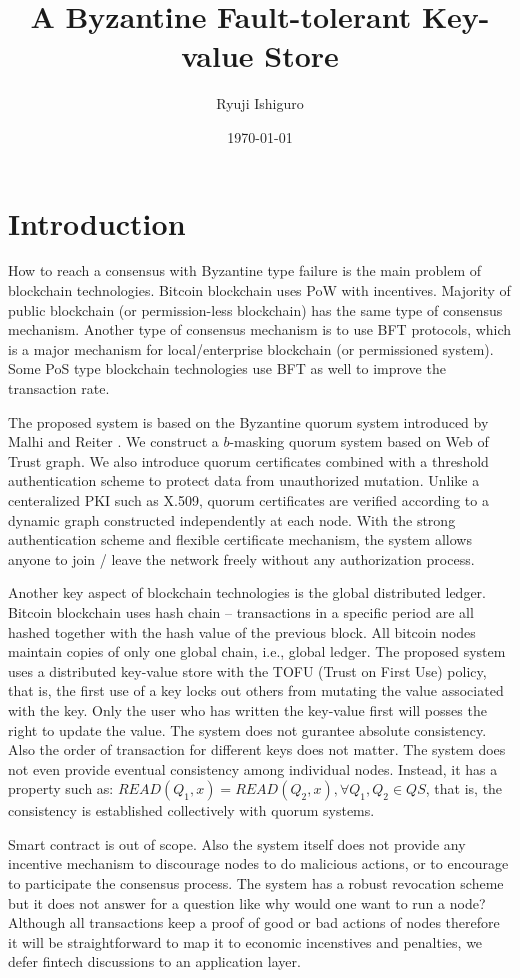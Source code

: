 \documentclass[twoside,twocolumn,10pt,fleqn]{article}
\title{A Byzantine Fault-tolerant Key-value Store}
\author{Ryuji Ishiguro}
\date{\today}
\begin{document}
\maketitle

\section{Introduction}
How to reach a consensus with Byzantine type failure is the main
problem of blockchain technologies. Bitcoin blockchain uses PoW with
incentives. Majority of public blockchain (or permission-less
blockchain) has the same type of consensus mechanism. Another type of
consensus mechanism is to use BFT protocols, which is a major
mechanism for local/enterprise blockchain (or permissioned
system). Some PoS type blockchain technologies use BFT as well to
improve the transaction rate.

The proposed system is based on the Byzantine quorum system introduced
by Malhi and Reiter \cite{Delhi:1}. We construct a $b$-masking quorum
system based on Web of Trust graph. We also introduce quorum certificates
combined with a threshold authentication scheme to protect data from
unauthorized mutation. Unlike a centeralized PKI such as X.509, quorum
certificates are verified according to a dynamic graph constructed
independently at each node. With the strong authentication scheme and
flexible certificate mechanism, the system allows anyone to join /
leave the network freely without any authorization process.

Another key aspect of blockchain technologies is the global
distributed ledger. Bitcoin blockchain uses hash chain -- transactions
in a specific period are all hashed together with the hash value of
the previous block. All bitcoin nodes maintain copies of only one
global chain, i.e., global ledger.
The proposed system uses a distributed key-value store with the TOFU
(Trust on First Use) policy, that is, the first use of a key locks out
others from mutating the value associated with the key. Only the
user who has written the key-value first will posses the right to
update the value. The system does not gurantee absolute
consistency. Also the order of transaction for different keys does not
matter. The system does not even provide eventual consistency among
individual nodes. Instead, it has a property such as: $READ(Q_1, x) =
READ(Q_2, x), \forall Q_1, Q_2 \in QS$, that is, the consistency is
established collectively with quorum systems.

Smart contract is out of scope. Also the system itself does not
provide any incentive mechanism to discourage nodes to do malicious
actions, or to encourage to participate the consensus process. The
system has a robust revocation scheme but it does not answer for a
question like why would one want to run a node? Although all
transactions keep a proof of good or bad actions of nodes therefore it
will be straightforward to map it to economic incenstives and
penalties, we defer fintech discussions to an application layer.
\end{document}
